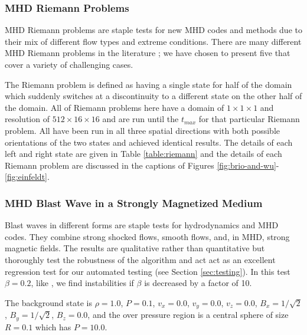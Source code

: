 \subsubsection{MHD Riemann Problems}
\label{sec:riemann}

MHD Riemann problems are staple tests for new MHD codes and methods due to their mix of different flow types and extreme conditions. There are many different MHD Riemann problems in the literature \citep{brio_wu_1988, einfeldt_1991, ryu_jones_1995, dai_woodward_1998}; we have chosen to present five that cover a variety of challenging cases. 

The Riemann problem is defined as having a single state for half of the domain which suddenly switches at a discontinuity to a different state on the other half of the domain. All of Riemann problems here have a domain of $1\times1\times1$ and resolution of $512\times16\times16$ and are run until the $t_{max}$ for that particular Riemann problem. All have been run in all three spatial directions with both possible orientations of the two states and achieved identical results. The details of each left and right state are given in Table \ref{table:riemann} and the details of each Riemann problem are discussed in the captions of Figures \ref{fig:brio-and-wu}-\ref{fig:einfeldt}.





\subsubsection{MHD Blast Wave in a Strongly Magnetized Medium}
\label{sec:mhd-blast}

Blast waves in different forms are staple tests for hydrodynamics and MHD codes. They combine strong shocked flows, smooth flows, and, in MHD, strong magnetic fields. The results are qualitative rather than quantitative but thoroughly test the robustness of the algorithm and act act as an excellent regression test for our automated testing (see Section \ref{sec:testing}). In this test $\beta = 0.2$, like \cite{stone_2009}, we find instabilities if $\beta$ is decreased by a factor of 10. 

The background state is
$\rho = 1.0$,
$P = 0.1$,
$v_x = 0.0$,
$v_y = 0.0$,
$v_z = 0.0$,
$B_x = 1/\sqrt{2}$,
$B_y = 1/\sqrt{2}$,
$B_z = 0.0$,
and the over pressure region is a central sphere of size $R = 0.1$ which has $P=10.0$.

